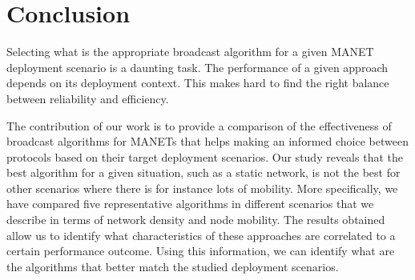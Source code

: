 
\section{Conclusion}
\label{sec:conclusion}

Selecting what is the appropriate broadcast algorithm for a given MANET deployment scenario is a daunting task.
%
The performance of a given approach depends on its deployment context.
This makes hard to find the right balance between reliability and efficiency.

The contribution of our work is to provide a comparison of the effectiveness of broadcast algorithms for MANETs that helps making an informed choice between protocols based on their target deployment scenarios.
%
Our study reveals that the best algorithm for a given situation, such as a static network, is not the best for other scenarios where there is for instance lots of mobility.
%
More specifically, we have compared five representative algorithms in different scenarios that we describe in terms of network density and node mobility.
%
The results obtained allow us to identify what characteristics of these approaches are correlated to a certain performance outcome.
%
Using this information, we can identify what are the algorithms that better match the studied deployment scenarios.

